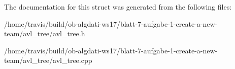 The documentation for this struct was generated from the following files\-:\begin{DoxyCompactItemize}
\item 
/home/travis/build/ob-\/algdati-\/ws17/blatt-\/7-\/aufgabe-\/1-\/create-\/a-\/new-\/team/avl\-\_\-tree/avl\-\_\-tree.\-h\item 
/home/travis/build/ob-\/algdati-\/ws17/blatt-\/7-\/aufgabe-\/1-\/create-\/a-\/new-\/team/avl\-\_\-tree/avl\-\_\-tree.\-cpp\end{DoxyCompactItemize}
